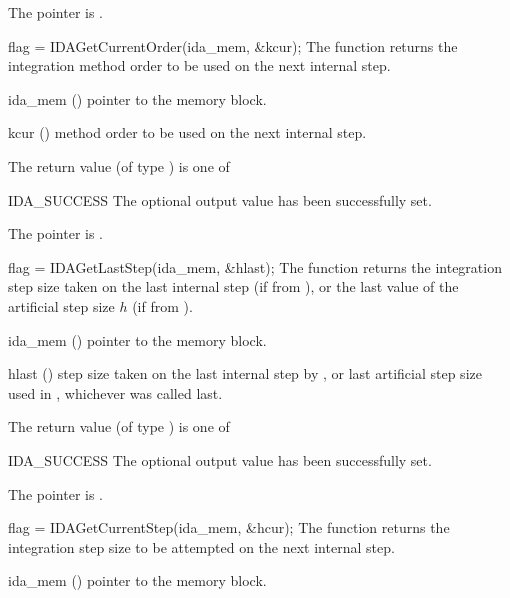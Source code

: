 {{\begin{args}
    The  pointer is .
  \end{args}
}
{}
{
  flag = IDAGetCurrentOrder(ida\_mem, \&kcur);
}
{
  The function  returns the
  integration method order to be used on the next internal step.
}
{
  \begin{args}
  \item[ida\_mem] ()
    pointer to the {\idas} memory block.
  \item[kcur] ()
    method order to be used on the next internal step.
  \end{args}
}
{
  The return value  (of type ) is one of
  \begin{args}
  \item[IDA\_SUCCESS]
    The optional output value has been successfully set.
  \item[\Id{IDA\_MEM\_NULL}]
    The  pointer is .
  \end{args}
}
{}
{
  flag = IDAGetLastStep(ida\_mem, \&hlast);
}
{
  The function  returns the
  integration step size taken on the last internal step (if from ),
  or the last value of the artificial step size $h$ (if from ).
}
{
  \begin{args}
  \item[ida\_mem] ()
    pointer to the {\idas} memory block.
  \item[hlast] ()
    step size taken on the last internal step by {\idas}, or last artificial
    step size used in , whichever was called last.
  \end{args}
}
{
  The return value  (of type ) is one of
  \begin{args}
  \item[IDA\_SUCCESS]
    The optional output value has been successfully set.
  \item[\Id{IDA\_MEM\_NULL}]
    The  pointer is .
  \end{args}
}
{}
{
  flag = IDAGetCurrentStep(ida\_mem, \&hcur);
}
{
  The function  returns the
  integration step size to be attempted on the next internal step.
}
{
  \begin{args}
  \item[ida\_mem] ()
    pointer to the {\idas} memory block.

\end{args}}}
